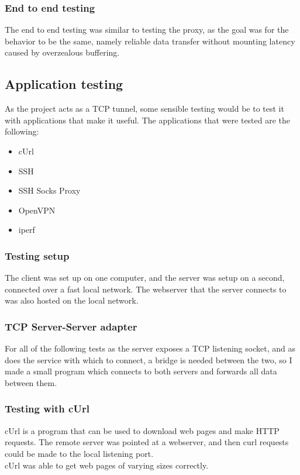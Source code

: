 \subsubsection{End to end testing}
The end to end testing was similar to testing the proxy, as the goal was for the behavior to be the same, namely reliable data transfer without mounting latency caused by overzealous buffering.

\subsection{Application testing}
As the project acts as a TCP tunnel, some sensible testing would be to test it with applications that make it useful.
The applications that were tested are the following:
\begin{itemize}
    \item cUrl
    \item SSH
    \item SSH Socks Proxy
    \item OpenVPN
    \item iperf
\end{itemize}

\subsubsection{Testing setup}
The client was set up on one computer, and the server was setup on a second, connected over a fast local network.
The webserver that the server connects to was also hosted on the local network.

\subsubsection{TCP Server-Server adapter}
For all of the following tests as the server exposes a TCP listening socket, and as does the service with which to connect, a bridge is needed between the two, so I made a small program which connects to both servers and forwards all data between them.

\subsubsection{Testing with cUrl}
cUrl is a program that can be used to download web pages and make HTTP requests.
The remote server was pointed at a webserver, and then curl requests could be made to the local listening port.\\
cUrl was able to get web pages of varying sizes correctly.

